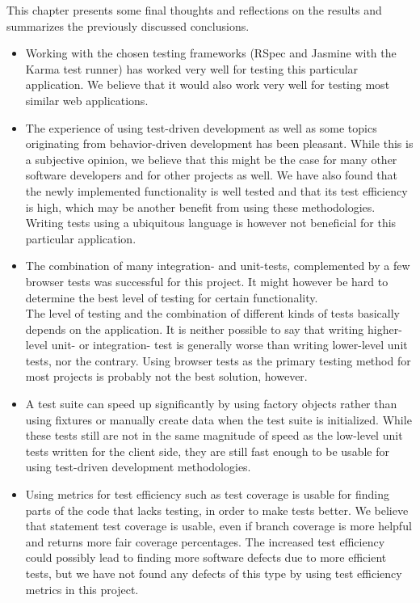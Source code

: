 
This chapter presents some final thoughts and reflections on the results
and summarizes the previously discussed conclusions.\\

\begin{itemize}

\item  Working with the chosen testing frameworks (RSpec and Jasmine
with the Karma test runner) has worked very well for testing this
particular application. We believe that it would also work very well for
testing most similar web applications.\\

\item The experience of using test-driven development as well as some
topics originating from behavior-driven development has been pleasant.
While this is a subjective opinion, we believe that this might be the
case for many other software developers and for other projects as well.
We have also found that the newly implemented functionality is well
tested and that its test efficiency is high, which may be another
benefit from using these methodologies. Writing tests using a
ubiquitous language is however not beneficial for this particular
application.\\

\item The combination of many integration- and unit-tests, complemented
by a few browser tests was successful for this project. It might however
be hard to determine the best level of testing for certain
functionality.\\

The level of testing and the combination of different kinds of tests
basically depends on the application. It is neither possible to say that
writing higher-level unit- or integration- test is generally worse
than writing lower-level unit tests, nor the contrary. Using browser
tests as the primary testing method for most projects is probably not
the best solution, however.\\

\item A test suite can speed up significantly by using factory objects
rather than using fixtures or manually create data when the test suite
is initialized. While these tests still are not in the same magnitude of
speed as the low-level unit tests written for the client side, they are
still fast enough to be usable for using test-driven development
methodologies.\\

\item Using metrics for test efficiency such as test coverage is usable
for finding parts of the code that lacks testing, in order to make tests
better. We believe that statement test coverage is usable, even if
branch coverage is more helpful and returns more fair coverage
percentages. The increased test efficiency could possibly lead to
finding more software defects due to more efficient tests, but we have
not found any defects of this type by using test efficiency metrics in
this project.\\

\end{itemize}
